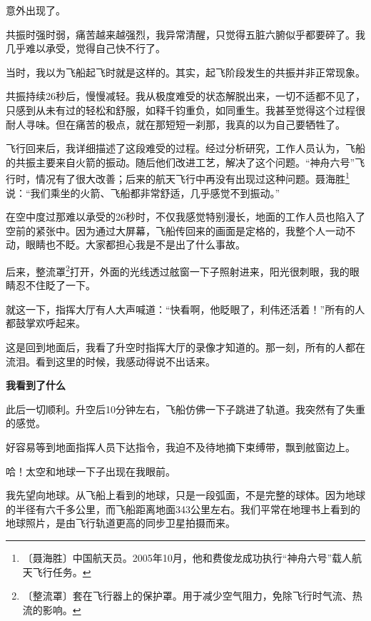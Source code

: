 \documentclass[12pt,UTF-8,openany]{ctexbook}
\begin{document}
\begin{normalsize}
    意外出现了。
    
    共振时强时弱，痛苦越来越强烈，我异常清醒，只觉得五脏六腑似乎都要碎了。我几乎难以承受，觉得自己快不行了。
    
    当时，我以为飞船起飞时就是这样的。其实，起飞阶段发生的共振并非正常现象。
    
    共振持续26秒后，慢慢减轻。我从极度难受的状态解脱出来，一切不适都不见了，只感到从未有过的轻松和舒服，如释千钧重负，如同重生。我甚至觉得这个过程很耐人寻味。但在痛苦的极点，就在那短短一刹那，我真的以为自己要牺牲了。
    
    飞行回来后，我详细描述了这段难受的过程。经过分析研究，工作人员认为，飞船的共振主要来自火箭的振动。随后他们改进工艺，解决了这个问题。“神舟六号”飞行时，情况有了很大改善；后来的航天飞行中再没有出现过这种问题。聂海胜\footnote{〔聂海胜〕中国航天员。2005年10月，他和费俊龙成功执行“神舟六号”载人航天飞行任务。}说：“我们乘坐的火箭、飞船都非常舒适，几乎感觉不到振动。”
    
    在空中度过那难以承受的26秒时，不仅我感觉特别漫长，地面的工作人员也陷入了空前的紧张中。因为通过大屏幕，飞船传回来的画面是定格的，我整个人一动不动，眼睛也不眨。大家都担心我是不是出了什么事故。
    
    后来，整流罩\footnote{〔整流罩〕套在飞行器上的保护罩。用于减少空气阻力，免除飞行时气流、热流的影响。}打开，外面的光线透过舷窗一下子照射进来，阳光很刺眼，我的眼睛忍不住眨了一下。
    
    就这一下，指挥大厅有人大声喊道：“快看啊，他眨眼了，利伟还活着！”所有的人都鼓掌欢呼起来。
    
    这是回到地面后，我看了升空时指挥大厅的录像才知道的。那一刻，所有的人都在流泪。看到这里的时候，我感动得说不出话来。
    
    \begin{center}
    
    \begin{large}\textbf{我看到了什么}\end{large}
    
    \end{center}
    
    此后一切顺利。升空后10分钟左右，飞船仿佛一下子跳进了轨道。我突然有了失重的感觉。
    
    好容易等到地面指挥人员下达指令，我迫不及待地摘下束缚带，飘到舷窗边上。
    
    哈！太空和地球一下子出现在我眼前。
    
    我先望向地球。从飞船上看到的地球，只是一段弧面，不是完整的球体。因为地球的半径有六千多公里，而飞船距离地面343公里左右。我们平常在地理书上看到的地球照片，是由飞行轨道更高的同步卫星拍摄而来。
    

\end{normalsize}
\end{document}

